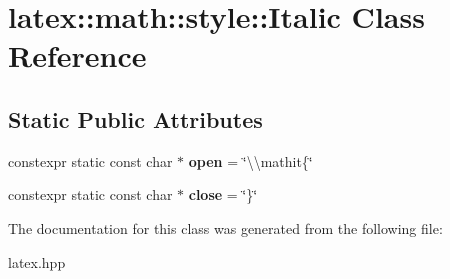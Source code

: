 \hypertarget{classlatex_1_1math_1_1style_1_1Italic}{\section{latex\-:\-:math\-:\-:style\-:\-:Italic Class Reference}
\label{classlatex_1_1math_1_1style_1_1Italic}
}
\subsection*{Static Public Attributes}
\begin{DoxyCompactItemize}
\item 
\hypertarget{classlatex_1_1math_1_1style_1_1Italic_ae4fe085f6fa089c2b02d730f29bcefdf}{constexpr static const char $\ast$ {\bfseries open} = \char`\"{}\textbackslash{}\textbackslash{}mathit\{\char`\"{}}\label{classlatex_1_1math_1_1style_1_1Italic_ae4fe085f6fa089c2b02d730f29bcefdf}

\item 
\hypertarget{classlatex_1_1math_1_1style_1_1Italic_af0231e0f1e907b38e9e1db90c67686dd}{constexpr static const char $\ast$ {\bfseries close} = \char`\"{}\}\char`\"{}}\label{classlatex_1_1math_1_1style_1_1Italic_af0231e0f1e907b38e9e1db90c67686dd}

\end{DoxyCompactItemize}


The documentation for this class was generated from the following file\-:\begin{DoxyCompactItemize}
\item 
latex.\-hpp\end{DoxyCompactItemize}
